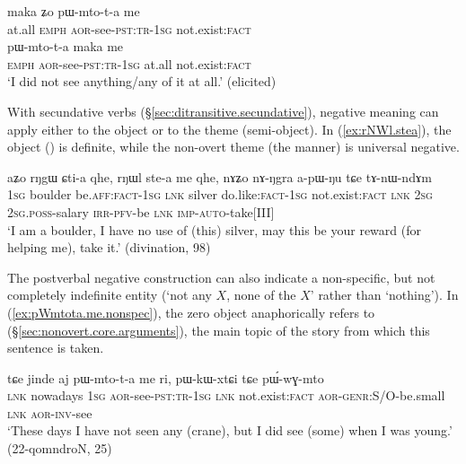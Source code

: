 \begin{exe}
\ex 
\begin{xlist}
\ex \label{ex:maka.V.me}
\gll maka ʑo pɯ-mto-t-a me \\
at.all \textsc{emph} \textsc{aor}-see-\textsc{pst}:\textsc{tr}-\textsc{1sg} not.exist:\textsc{fact} \\
\ex \label{ex:V.maka.me}
\gll pɯ-mto-t-a maka me \\
\textsc{emph} \textsc{aor}-see-\textsc{pst}:\textsc{tr}-\textsc{1sg} at.all  not.exist:\textsc{fact} \\
\glt `I did not see anything/any of it at all.' (elicited)
\end{xlist}
\end{exe}

With secundative verbs (§\ref{sec:ditransitive.secundative}), negative meaning can apply either to the object or to the theme (semi-object). In (\ref{ex:rNWl.stea}), the object () is definite, while the non-overt theme (the manner) is universal negative.


\begin{exe}
\ex \label{ex:rNWl.stea}
\gll aʑo rŋgɯ ɕti-a qhe, rŋɯl ste-a me qhe, nɤʑo nɤ-ŋgra a-pɯ-ŋu tɕe tɤ-nɯ-ndɤm \\
\textsc{1sg} boulder be.\textsc{aff}:\textsc{fact}-\textsc{1sg} \textsc{lnk} silver do.like:\textsc{fact}-\textsc{1sg} not.exist:\textsc{fact} \textsc{lnk} \textsc{2sg} \textsc{2sg}.\textsc{poss}-salary \textsc{irr}-\textsc{pfv}-be \textsc{lnk} \textsc{imp}-\textsc{auto}-take[III] \\
\glt `I am a boulder, I have no use of (this) silver, may this be your reward (for helping me), take it.' (divination, 98)
\end{exe}

The postverbal negative construction can also indicate a non-specific, but not completely indefinite entity (`not any $X$, none of the $X$' rather than `nothing'). In (\ref{ex:pWmtota.me.nonspec}), the zero object anaphorically refers to  (§\ref{sec:nonovert.core.arguments}), the main topic of the story from which this sentence is taken.

\begin{exe}
\ex \label{ex:pWmtota.me.nonspec}
\gll tɕe jinde aj pɯ-mto-t-a me ri, pɯ-kɯ-xtɕi tɕe pɯ́-wɣ-mto \\
\textsc{lnk} nowadays \textsc{1sg} \textsc{aor}-see-\textsc{pst}:\textsc{tr}-\textsc{1sg} \textsc{lnk} not.exist:\textsc{fact} \textsc{aor}-\textsc{genr}:S/O-be.small \textsc{lnk} \textsc{aor}-\textsc{inv}-see \\
\glt `These days I have not seen any (crane), but I did see (some) when I was young.' (22-qomndroN, 25)
\end{exe}

